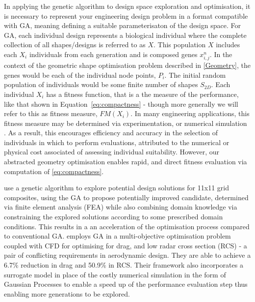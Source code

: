 \documentclass{article}
\begin{document}
In applying the genetic algorithm to design space exploration and optimisation, it is necessary to represent your engineering design problem in a format compatible with GA, meaning defining a suitable parameterisaton of the design space. For GA, each individual design represents a biological individual where the complete collection of all shapes/designs is referred to as $X$. This population $X$ includes each $X_i$ individuals from each generation and is composed genes $x^n_{i,j}$. In the context of the geometric shape optimisation problem described in \ref{Geometry}, the genes would be each of the individual node points, $P_i$. The initial random population of individuals would be some finite number of shapes $S_{2D}$. Each individual $X_i$ has a fitness function, that is a the measure of the performance, like that shown in Equation~\eqref{eq:compactness} - though more generally we will refer to this as fitness measure, $FM(X_i)$. In many engineering applications, this fitness measure may be determined via experimentation, or numerical simulation \citep{Pimentel2022}. As a result, this encourages efficiency and accuracy in the selection of individuals in which to perform evaluations, attributed to the numerical or physical cost associated of assessing individual suitability. However, our abstracted geometry optimisation enables rapid, and direct fitness evaluation via computation of \eqref{eq:compactness}.

\cite{Kim2021} use a genetic algorithm to explore potential design solutions for 11x11 grid composites, using the GA to propose potentially improved candidate, determined via finite element analysis (FEA) while also combining domain knowledge via constraining the explored solutions according to some prescribed domain conditions. This results in a an acceleration of the optimisation process compared to conventional GA. \cite{Taj2023} employs GA in a multi-objective optimisation problem coupled with CFD for optimising for drag, and low radar cross section (RCS) -  a pair of conflicting requirements in aerodynamic design. They are able to achieve a  6.7\% reduction in drag and 50.9\% in RCS. Their framework also incorporates a surrogate model in place of the costly numerical simulation in the form of Gaussian Processes to enable a speed up of the performance evaluation step thus enabling more generations to be explored.
\end{document}
